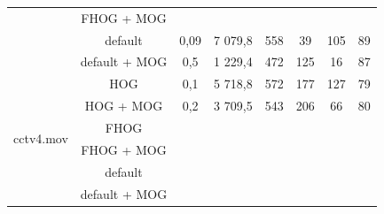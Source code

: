\begin{table}[H]
\begin{tabular}{|c|c|c|c|c|c|c|c|}
                         & FHOG + MOG 		&         &               	  &    &    &    &          \\ \cline{2-8} 
                         & default	 		&  0,09   &   7 079,8      	  & 558     & 39 & 105    &   89                  \\ \cline{2-8} 
                         & default + MOG 	&  0,5    &   1 229,4           & 472     & 125& 16   &     87                   \\ \hline \hline
\multirow{6}{*}{cctv4.mov} & HOG        	&  0,1    &   5 718,8     	  & 572     & 177  & 127  &   79		    \\ \cline{2-8} 
                         & HOG + MOG  		&  0,2    &   3 709,5      	  & 543     & 206  & 66   &   80          \\ \cline{2-8} 
                         & FHOG       		&         &               	  &    &    &    &          \\ \cline{2-8} 
                         & FHOG + MOG 		&         &               	  &    &    &    &          \\ \cline{2-8} 
                         & default	 		&         &               	  &      &  &       &          \\ \cline{2-8} 
                         & default + MOG 	&         &               	  &    &    &    &          \\ \hline
\end{tabular}
\end{table}

